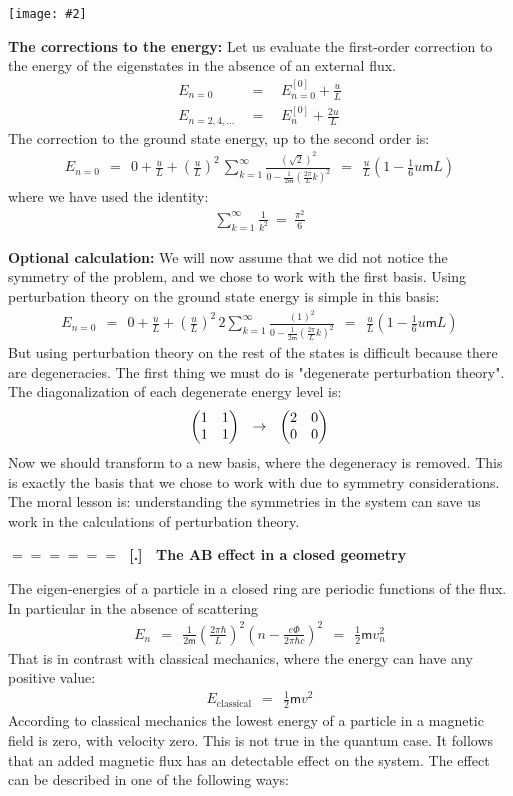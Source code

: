 \documentclass[onecolumn,fleqn]{revtex4}
\newcommand{\mass}{\mathsf{m}}
\newcommand{\amatrix}[1]{\begin{matrix} #1 \end{matrix}}
\newcommand{\putgraph}[2][0.30\hsize]{\texttt{[image: \#2]}}
\newcommand{\beq}{\begin{eqnarray}}
\newcommand{\eeq}{\end{eqnarray}}
\renewcommand{\thesubsection}{\arabic{subsection}}
\renewcommand{\thesubsubsection}{\arabic{subsubsection}}
\newcommand{\sheadC}[1]
{
\addtocounter{subsubsection}{1}
\vspace{5mm}
{\Large\bf $=\!=\!=\!=\!=\!=\;$ [\thesubsection.\thesubsubsection] \ #1}  
\nopagebreak
\phantomsection
}
\begin{document}
\begin{center}
\putgraph[0.4\hsize]{boxlevels} 
\end{center}

 



{\bf The corrections to the energy:} 
Let us evaluate the first-order correction to the energy 
of the eigenstates in the absence of an external flux.
\beq
E_{n{=}0} \ \ &=& \ \ E_{n{=}0}^{[0]} + \frac{u}{L}
\\ \nonumber
E_{n{=}2,4,\dots} \ \ &=& \ \ E_n^{[0]} + \frac{2u}{L} 
\eeq
The correction to the ground state 
energy, up to the second order is:
\beq
E_{n{=}0} \ \ = \ \ 0 + \frac{u}{L} + \left(\frac{u}{L}\right)^2 \, 
\sum_{k=1}^{\infty}
\frac{(\sqrt{2})^2} {0-\frac{1}{2\mass}
\left(\frac{2\pi}{L}k\right)^2} 
\ \ = \ \ 
\frac{u}{L}\left (1-\frac{1}{6}u \mass L \right) 
\eeq
where we have used the identity:
\beq
\sum_{k=1}^{\infty}\frac{1}{k^2} \ = \ \frac{\pi^2}{6} 
\eeq




{\bf Optional calculation:} 
We will now assume that we did not notice the 
symmetry of the problem, and we chose to work with 
the first basis. Using perturbation theory 
on the ground state energy is simple in this basis:
\beq
E_{n{=}0} \ \ = \ \ 0 + \frac{u}{L} + \left(\frac{u}{L}\right)^2 \, 
2\sum_{k=1}^{\infty}\frac{(1)^2} {0-\frac{1}{2\mass}\left(\frac{2\pi}{L}k\right)^2} 
\ \ = \ \ 
\frac{u}{L}\left (1-\frac{1}{6}u \mass L \right) 
\eeq
But using perturbation theory on the rest of 
the states is difficult because there are degeneracies. 
The first thing we must do is "degenerate perturbation theory". 
The diagonalization of each degenerate energy level is:
\beq
\left(\amatrix{1 & 1 \cr 1 & 1 } \right) \ \  \rightarrow \ \ \left(\amatrix{2 & 0 \cr 0 & 0 } \right) 
\eeq
Now we should transform to a new basis, where the 
degeneracy is removed. This is exactly the 
basis that we chose to work with due to symmetry 
considerations. The moral lesson is: understanding the 
symmetries in the system can save us work in the 
calculations of perturbation theory. 



\sheadC{The AB effect in a closed geometry}

The eigen-energies of a particle in a closed ring 
are periodic functions of the flux.
In particular in the absence of scattering   
\beq
E_n \ \ = \ \ \frac {1}{2\mass} 
\left( \frac {2 \pi\hbar}{L} \right)^2 
\left( n- \frac {e\Phi}{2\pi\hbar c}\right)^2 
\ \ = \ \ \frac{1}{2}\mass v_n^2 
\eeq
That is in contrast with classical mechanics, 
where the energy can have any positive value:
\beq
E_{\mbox{classical}} \ \ = \ \ \frac {1}{2} \mass v^2 
\eeq
According to classical mechanics the lowest energy 
of a particle in a magnetic field is zero, with velocity zero. 
This is not true in the quantum case. 
It follows that an added magnetic flux has 
an detectable effect on the system. 
The effect can be described in one of the following ways:
\end{document}
